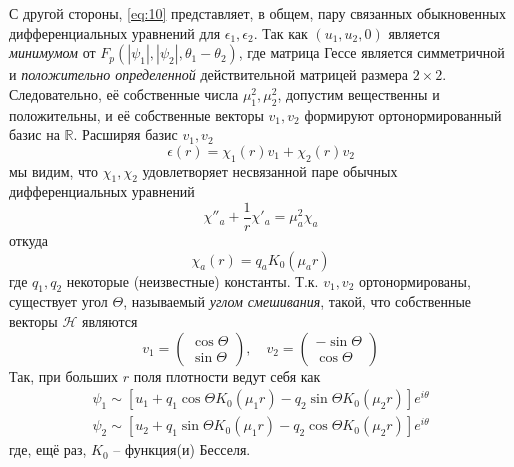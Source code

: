 С другой стороны, \eqref{eq:10} представляет, в общем, пару связанных 
обыкновенных дифференциальных уравнений для \( \epsilon_1, \epsilon_2 \). Так 
как \( (u_1, u_2, 0 ) \) является \textit{минимумом} от 
\( F_p(|\psi_1|, |\psi_2|, \theta_1 - \theta_2) \), где матрица Гессе является  
симметричной и \textit{положительно определенной} действительной матрицей 
размера \( 2\times2 \). Следовательно, её собственные числа 
\( \mu_1^2, \mu_2^2\), допустим вещественны и положительны, и её собственные 
векторы \( v_1, v_2 \) формируют ортонормированный базис на \( \mathbb{R} \). 
Расширяя базис \( v_1, v_2 \)
\begin{equation}
    \epsilon(r) = \chi_1(r) v_1 + \chi_2(r) v_2
    \label{eq:17}
\end{equation}
мы видим, что \( \chi_1, \chi_2 \) удовлетворяет несвязанной паре обычных 
дифференциальных уравнений
\begin{equation}
    \chi''_a + \frac{1}{r}\chi'_a = \mu_a^2 \chi_a
    \label{eq:18}
\end{equation}
откуда
\begin{equation}
    \chi_a(r) = q_a K_0(\mu_a r)
    \label{eq:19}
\end{equation}
где \( q_1, q_2 \) некоторые (неизвестные) константы. Т.к. \( v_1, v_2 \) 
ортонормированы, существует угол \( \Theta \), называемый 
\textit{углом смешивания}, такой, что собственные векторы \( \mathcal{H} \) 
являются
\begin{equation}
    v_1 = \left( \begin{array}{c}
        \cos\Theta \\
        \sin\Theta
    \end{array} \right), \quad
    v_2 = \left( \begin{array}{c}
        -\sin\Theta \\
        \cos\Theta
    \end{array} \right)
    \label{eq:20}
\end{equation}
Так, при больших \( r \) поля плотности ведут себя как 
\begin{gather}
    \psi_1 \sim \left[ u_1 + q_1\cos\Theta K_0(\mu_1 r) - 
        q_2\sin\Theta K_0(\mu_2 r) \right]e^{i\theta} \nonumber \\
    \psi_2 \sim \left[ u_2 + q_1\sin\Theta K_0(\mu_1 r) - 
        q_2\cos\Theta K_0(\mu_2 r) \right]e^{i\theta}
    \label{eq:21}
\end{gather}
где, ещё раз, \( K_0 \) -- функция(и) Бесселя.

